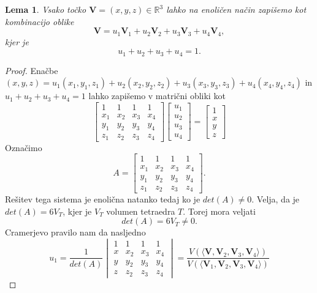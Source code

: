 \documentclass[a4paper, 12pt]{article}
\theoremstyle{definition} %
\theoremstyle{plain} %
\newtheorem{lemma}[theorem]{Lema}
\begin{document}
\begin{lemma}
Vsako točko $\textbf{V} = (x, y, z) \in \mathbb{R}^{3}$  lahko na enoličen način zapišemo kot kombinacijo oblike
\begin{equation}
\textbf{V} = u_{1}\textbf{V}_{1} + u_{2}\textbf{V}_{2} + u_{3}\textbf{V}_{3} + u_{4}\textbf{V}_{4},
\end{equation}
kjer je
$$
u_{1} + u_{2} + u_{3} + u_{4} = 1.
$$
\end{lemma}
\begin{proof}
Enačbe $(x, y, z) = u_{1}(x_{1}, y_{1}, z_{1}) + u_{2}(x_{2}, y_{2}, z_{2}) + u_{3}(x_{3}, y_{3}, z_{3}) + u_{4}(x_{4}, y_{4}, z_{4}) $ in $u_{1} + u_{2} + u_{3} + u_{4} = 1$ lahko zapišemo v matrični obliki kot
$$
\begin{bmatrix}
  1 & 1 & 1 & 1\\ 
  x_{1} & x_{2} & x_{3} & x_{4}\\
  y_{1} & y_{2} & y_{3} & y_{4}\\
  z_{1} & z_{2} & z_{3} & z_{4}
\end{bmatrix}
\begin{bmatrix}
u_{1}\\
u_{2}\\
u_{3}\\
u_{4}
\end{bmatrix}
=
\begin{bmatrix}
1\\
x\\
y\\
z
\end{bmatrix}
$$
Označimo
$$
A = \begin{bmatrix}
  1 & 1 & 1 & 1\\ 
  x_{1} & x_{2} & x_{3} & x_{4}\\
  y_{1} & y_{2} & y_{3} & y_{4}\\
  z_{1} & z_{2} & z_{3} & z_{4}
\end{bmatrix}.
$$
Rešitev tega sistema je enolična natanko tedaj ko je $det(A) \neq 0$. Velja, da je $det(A) = 6V_{T}$, kjer je $V_{T}$ volumen tetraedra $T$. Torej mora veljati
$$
det(A) = 6V_{T} \neq 0.
$$
Cramerjevo pravilo nam da nasljedno
$$
u_{1} = \frac{1}{det(A)}
\begin{vmatrix}
  1 & 1 & 1 & 1\\ 
  x & x_{2} & x_{3} & x_{4}\\
  y & y_{2} & y_{3} & y_{4}\\
  z & z_{2} & z_{3} & z_{4}
\end{vmatrix}
=
\frac{V(\langle\textbf{V}, \textbf{V}_{2}, \textbf{V}_{3}, \textbf{V}_{4}\rangle)}{V(\langle\textbf{V}_{1}, \textbf{V}_{2}, \textbf{V}_{3}, \textbf{V}_{4}\rangle)}
$$
\end{proof}
\end{document}
